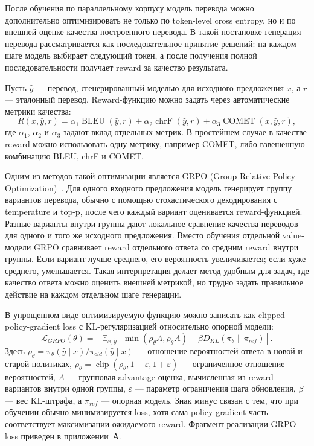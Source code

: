 После обучения по параллельному корпусу модель перевода можно дополнительно оптимизировать не только по token-level cross entropy, но и по внешней оценке качества построенного перевода. В такой постановке генерация перевода рассматривается как последовательное принятие решений: на каждом шаге модель выбирает следующий токен, а после получения полной последовательности получает reward за качество результата.

Пусть $\hat{y}$ --- перевод, сгенерированный моделью для исходного предложения $x$, а $r$ --- эталонный перевод. Reward-функцию можно задать через автоматические метрики качества:
\[
	R(x, \hat{y}, r) = \alpha_1 \operatorname{BLEU}(\hat{y}, r) +
	\alpha_2 \operatorname{chrF}(\hat{y}, r) +
	\alpha_3 \operatorname{COMET}(x, \hat{y}, r),
\]
где $\alpha_1$, $\alpha_2$ и $\alpha_3$ задают вклад отдельных метрик. В простейшем случае в качестве reward можно использовать одну метрику, например COMET, либо взвешенную комбинацию BLEU, chrF и COMET.

Одним из методов такой оптимизации является GRPO (Group Relative Policy Optimization)~\cite{grpo}. Для одного входного предложения модель генерирует группу вариантов перевода, обычно с помощью стохастического декодирования с temperature и top-p, после чего каждый вариант оценивается reward-функцией. Разные варианты внутри группы дают локальное сравнение качества переводов для одного и того же исходного предложения. Вместо обучения отдельной value-модели GRPO сравнивает reward отдельного ответа со средним reward внутри группы. Если вариант лучше среднего, его вероятность увеличивается; если хуже среднего, уменьшается. Такая интерпретация делает метод удобным для задач, где качество ответа можно оценить внешней метрикой, но трудно задать правильное действие на каждом отдельном шаге генерации.

В упрощенном виде оптимизируемую функцию можно записать как clipped policy-gradient loss с KL-регуляризацией относительно опорной модели:
\[
	\mathcal{L}_{GRPO}(\theta) = -\mathbb{E}_{x, \hat{y}}
	\left[
		\min\left(\rho_\theta A, \bar{\rho}_\theta A\right)
		- \beta D_{KL}(\pi_\theta \| \pi_{ref})
		\right].
\]
Здесь $\rho_\theta = \pi_\theta(\hat{y} \mid x) / \pi_{old}(\hat{y} \mid x)$ --- отношение вероятностей ответа в новой и старой политиках, $\bar{\rho}_\theta = \operatorname{clip}(\rho_\theta, 1 - \varepsilon, 1 + \varepsilon)$ --- ограниченное отношение вероятностей, $A$ --- групповая advantage-оценка, вычисленная из reward вариантов внутри одной группы, $\varepsilon$ --- параметр ограничения шага обновления, $\beta$ --- вес KL-штрафа, а $\pi_{ref}$ --- опорная модель. Знак минус связан с тем, что при обучении обычно минимизируется loss, хотя сама policy-gradient часть соответствует максимизации ожидаемого reward. Фрагмент реализации GRPO loss приведен в приложении~А.

